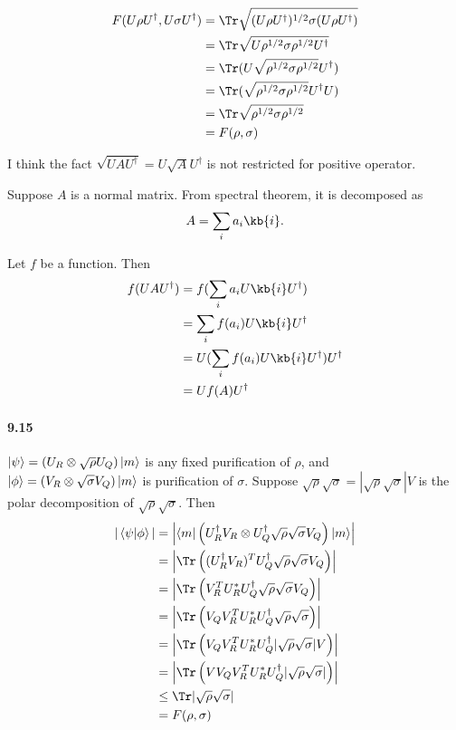 \begin{align*}
	F(U \rho U^\dagger, U \sigma U^\dagger) &= \Tr \sqrt{(U\rho U^\dagger)^{1/2} \sigma (U \rho U^\dagger)}\\
		&= \Tr \sqrt{U \rho^{1/2} \sigma \rho^{1/2} U^\dagger}\\
		&= \Tr (U \sqrt{\rho^{1/2} \sigma \rho^{1/2}} U^\dagger)\\
		&= \Tr (\sqrt{\rho^{1/2} \sigma \rho^{1/2}} U^\dagger U)\\
		&= \Tr \sqrt{\rho^{1/2} \sigma \rho^{1/2}}\\
		&= F(\rho, \sigma)
\end{align*}

\begin{screen}
	I think the fact $\sqrt{UAU^\dagger} = U\sqrt{A}U^\dagger$ is not restricted for positive operator.

	Suppose $A$ is a normal matrix. From spectral theorem, it is decomposed as
	\begin{align*}
		A = \sum_i a_i \kb{i}.
	\end{align*}

	Let $f$ be a function. Then
	\begin{align*}
		f(UAU^\dagger )&= f(\sum_i a_i U \kb{i} U^\dagger)\\
			&= \sum_i f(a_i) U \kb{i} U^\dagger\\
			&= U (\sum_i f(a_i) U \kb{i} U^\dagger) U^\dagger\\
			&= U f(A) U^\dagger
	\end{align*}
\end{screen}


\paragraph{9.15}
$\ket{\psi} = (U_R \otimes \sqrt{\rho}U_Q) \ket{m}$ is any fixed purification of $\rho$, and $\ket{\phi} = (V_R \otimes \sqrt{\sigma}V_Q) \ket{m}$ is purification of $\sigma$.
Suppose $\sqrt{\rho} \sqrt{\sigma} = |\sqrt{\rho} \sqrt{\sigma}| V$ is the polar decomposition of $\sqrt{\rho} \sqrt{\sigma}$. Then
%
\begin{align*}
    |\braket{\psi | \phi}| &= \left|\braket{m | \left( U_R^\dagger V_R \otimes U_Q^\dagger \sqrt{\rho} \sqrt{\sigma} V_Q \right) | m } \right|\\
        &= \left| \Tr \left((U_R^\dagger V_R)^T U_Q^\dagger \sqrt{\rho} \sqrt{\sigma} V_Q \right)\right|\\
        &= \left| \Tr \left( V_R^T U_R^* U_Q^\dagger \sqrt{\rho} \sqrt{\sigma} V_Q \right)\right|\\
        &= \left| \Tr \left( V_Q V_R^T U_R^* U_Q^\dagger \sqrt{\rho} \sqrt{\sigma} \right)\right|\\
        &= \left| \Tr \left( V_Q V_R^T U_R^* U_Q^\dagger |\sqrt{\rho} \sqrt{\sigma}| V \right)\right|\\
        &= \left| \Tr \left( V V_Q V_R^T U_R^* U_Q^\dagger |\sqrt{\rho} \sqrt{\sigma}| \right)\right|\\
        &\leq \Tr | \sqrt{\rho} \sqrt{\sigma}|\\
        &= F(\rho, \sigma)
\end{align*}

